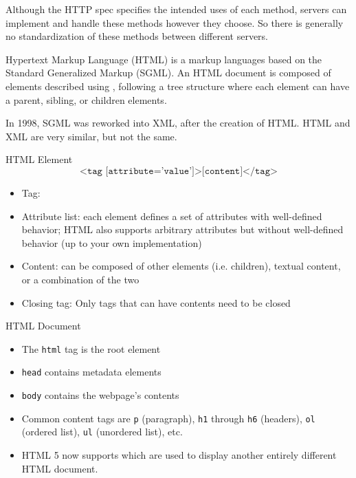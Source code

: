 Although the HTTP spec specifies the intended uses of each method, servers can implement and handle these methods however they choose. So there is generally no standardization of these methods between different servers.

\begin{dfnbox}{Hypertext Markup Language (HTML)}{}
     is a markup languages based on the Standard Generalized Markup (SGML). An HTML document is composed of elements described using , following a tree structure where each element can have a parent, sibling, or children elements.
\end{dfnbox}

In 1998, SGML was reworked into XML, after the creation of HTML. HTML and XML are very similar, but not the same.

\begin{dfnbox}{HTML Element}{}
    \[ \texttt{<tag [attribute='value']>[content]</tag>} \]
    \begin{itemize}
        \item Tag: 
        \item Attribute list: each element defines a set of attributes with well-defined behavior; HTML also supports arbitrary attributes but without well-defined behavior (up to your own implementation)
        \item Content: can be composed of other elements (i.e. children), textual content, or a combination of the two
        \item Closing tag: Only tags that can have contents need to be closed
    \end{itemize}
\end{dfnbox}

\begin{exbox}{HTML Document}{}
    \begin{itemize}
        \item The \texttt{html} tag is the root element
        \item \texttt{head} contains metadata elements
        \item \texttt{body} contains the webpage's contents
        \item Common content tags are \texttt{p} (paragraph), \texttt{h1} through \texttt{h6} (headers), \texttt{ol} (ordered list), \texttt{ul} (unordered list), etc.
        \item HTML 5 now supports  which are used to display another entirely different HTML document.
    \end{itemize}
\end{exbox}

